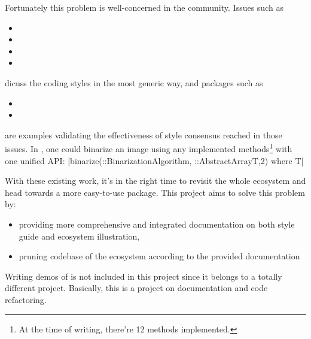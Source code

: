 Fortunately this problem is well-concerned in the community. Issues such as
\begin{itemize}
    \item {}
    \item {}
    \item {}
    \item {}
\end{itemize}
dicuss the coding styles in the most generic way, and packages such as
\begin{itemize}
    \item \repohistogramthresholding
    \item \repoimagebinarization
\end{itemize}
are examples validating the effectiveness of style consensus reached in those issues. In \imagebinarization, one could binarize an image using any implemented methods\footnote{At the time of writing, there're 12 methods implemented.} with one unified API: |binarize(::BinarizationAlgorithm, ::AbstractArray{T,2}) where {T}|

With these existing work, it's in the right time to revisit the whole \images{} ecosystem and head towards a more easy-to-use \images{} package. This project aims to solve this problem by:

\begin{itemize}
    \item providing more comprehensive and integrated documentation on both style guide and ecosystem illustration,
    \item pruning codebase of the ecosystem according to the provided documentation
\end{itemize}

Writing demos of \images{} is not included in this project since it belongs to a totally different project. Basically, this is a project on documentation and code refactoring.


